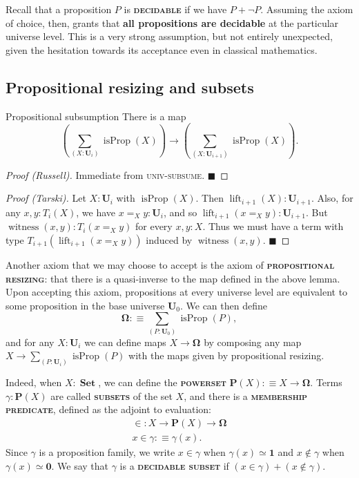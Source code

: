 \documentclass{article}
\newcommand{\defn}[1]{{\scshape\bfseries\color{MPBemph}#1}}
\renewcommand{\qed}{\hfill{\color{MPBthm}\( \blacksquare \)}}
\newcommand{\eql}{\mathbin{:\equiv}}
\newcommand{\U}{\mathbf{U}}
\DeclareMathOperator{\lift}{lift}
\newcommand{\tsigma}[1]{\sum_{(#1)}}
\newcommand{\1}{\textbf{1}}
\newcommand{\0}{\mathbf{0}}
\newcommand{\2}{\textbf{2}}
\DeclareMathOperator{\witness}{witness}
\DeclareMathOperator{\isProp}{isProp}
\DeclareMathOperator{\Set}{\textbf{Set}}
\newcommand{\PropO}{\mathbf{\Omega}}
\renewcommand{\P}{\textbf{P}}
\begin{document}
Recall that a proposition \( P \) is \defn{decidable} if we have \( P + \neg P \). Assuming the axiom of choice, then, grants that \textbf{all propositions are decidable} at the particular universe level. This is a very strong assumption, but not entirely unexpected, given the hesitation towards its acceptance even in classical mathematics.
\subsection{Propositional resizing and subsets}
\begin{lemma}{Propositional subsumption}{} There is a map
\[ (\tsigma{X : \U_{i}} \isProp(X)) \to (\tsigma{X : \U_{i + 1}} \isProp(X)). \]
\begin{proof}[Proof (Russell)]
	Immediate from \textsc{univ-subsume}. \qed
\end{proof} \begin{proof}[Proof (Tarski)]
	Let \( X : \U_{i} \) with \( \isProp(X) \). Then \( \lift_{i + 1}(X) : \U_{i + 1} \). Also, for any \( x, y : T_{i}(X) \), we have \( x =_{X} y : \U_{i} \), and so \( \lift_{i + 1}(x =_{X} y) : \U_{i + 1} \). But \( \witness(x, y) : T_{i}(x =_{X} y) \) for every \( x, y : X \). Thus we must have a term with type \( T_{i + 1}(\lift_{i + 1}(x =_{X} y)) \) induced by \( \witness(x, y) \). \qed
\end{proof} \end{lemma}%
Another axiom that we may choose to accept is the axiom of \defn{propositional resizing}: that there is a quasi-inverse to the map defined in the above lemma. Upon accepting this axiom, propositions at every universe level are equivalent to some proposition in the base universe \( \U_{0} \). We can then define
\[ \PropO \eql \tsigma{P : \U_{0}} \isProp(P), \]
and for any \( X : \U_{i} \) we can define maps \( X \to \PropO \) by composing any map \( X \to \tsigma{P : \U_{i}} \isProp(P) \) with the maps given by propositional resizing.

Indeed, when \( X : \Set \), we can define the \defn{powerset} \( \P(X) \eql X \to \PropO \). Terms \( \gamma : \P(X) \) are called \defn{subsets} of the set \( X \), and there is a \defn{membership predicate}, defined as the adjoint to evaluation:
\[ \begin{array}{c}
	{\in} : X \to \P(X) \to \PropO \\[3pt]
	x \in \gamma \eql \gamma(x).
\end{array} \]
Since \( \gamma \) is a proposition family, we write \( x \in \gamma \) when \( \gamma(x) \simeq \1 \) and \( x \notin \gamma \) when \( \gamma(x) \simeq \0 \). We say that \( \gamma \) is a \defn{decidable subset} if \( (x \in \gamma) + (x \notin \gamma) \).
\end{document}
